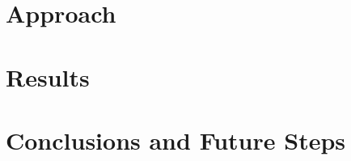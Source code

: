 \documentclass[letterpaper, 10 pt, conference]{ieeeconf}
\begin{document}
\section{Approach}
  \label{section:the_proposed_method}
  

\section{Results}
  \label{section:results}
  

\section{Conclusions and Future Steps}
  \label{section:finale}
  

\begin{thebibliography}{99}
  
\end{thebibliography}


\balance
\end{document}
